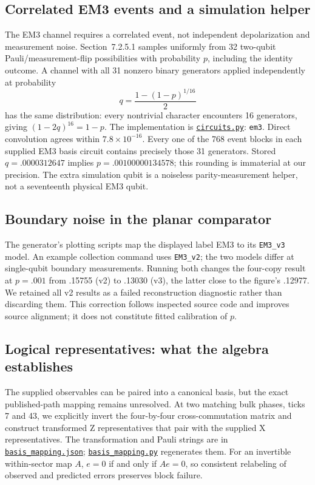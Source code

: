 \documentclass[11pt]{article}
\newcommand{\file}[2]{\href{https://github.com/alectionary/vibe-math/blob/master/formalization/higgott-quantum-decoding/#1}{\nolinkurl{#2}}}
\begin{document}
\subsection{Correlated EM3 events and a simulation helper}
The EM3 channel requires a correlated event, not independent depolarization and measurement noise. Section~7.2.5.1 samples uniformly from 32 two-qubit Pauli/measurement-flip possibilities with probability $p$, including the identity outcome. A channel with all 31 nonzero binary generators applied independently at probability
\[
 q=\frac{1-(1-p)^{1/16}}2
\]
has the same distribution: every nontrivial character encounters 16 generators, giving $(1-2q)^{16}=1-p$. The implementation is \file{circuits.py\#L19}{circuits.py}: \texttt{em3}. Direct convolution agrees within $7.8\times10^{-16}$. Every one of the 768 event blocks in each supplied EM3 basis circuit contains precisely those 31 generators. Stored $q=.0000312647$ implies $p=.00100000134578$; this rounding is immaterial at our precision. The extra simulation qubit is a noiseless parity-measurement helper, not a seventeenth physical EM3 qubit.

\subsection{Boundary noise in the planar comparator}
The generator's plotting scripts map the displayed label EM3 to its \texttt{EM3\_v3} model. An example collection command uses \texttt{EM3\_v2}; the two models differ at single-qubit boundary measurements. Running both changes the four-copy result at $p=.001$ from .15755 (v2) to .13030 (v3), the latter close to the figure's .12977. We retained all v2 results as a failed reconstruction diagnostic rather than discarding them. This correction follows inspected source code and improves source alignment; it does not constitute fitted calibration of $p$.

\subsection{Logical representatives: what the algebra establishes}
The supplied observables can be paired into a canonical basis, but the exact published-path mapping remains unresolved. At two matching bulk phases, ticks 7 and 43, we explicitly invert the four-by-four cross-commutation matrix and construct transformed Z representatives that pair with the supplied X representatives. The transformation and Pauli strings are in \file{revision2/basis_mapping.json}{basis_mapping.json}; \file{revision2/basis_mapping.py}{basis_mapping.py} regenerates them. For an invertible within-sector map $A$, $e=0$ if and only if $Ae=0$, so consistent relabeling of observed and predicted errors preserves block failure.
\end{document}
